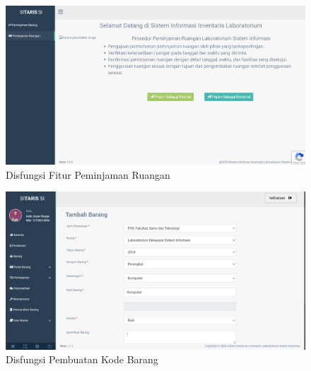 \begin{figure}
	\centering
	\includegraphics[width=0.82\linewidth]{konten//gambar/observasi-peminjaman-ruangan.png}
	\caption{Disfungsi Fitur Peminjaman Ruangan}
	\label{fig:enter-label}
\end{figure}

\begin{figure}
	\centering
	\includegraphics[width=0.82\linewidth]{konten//gambar/kode-barang.png}
	\caption{Disfungsi Pembuatan Kode Barang}
	\label{fig:enter-label}
\end{figure}
